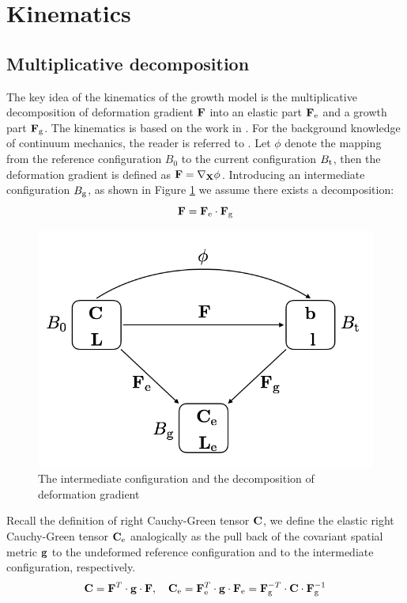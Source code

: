 \section{Kinematics} \label{Kinematics}
\subsection{Multiplicative decomposition}
The key idea of the kinematics of the growth model is the multiplicative decomposition of deformation gradient $\bold{F}$ into an elastic part $\bold{F}_{\mathrm{e}}$ and a growth part $\bold{F}_{\mathrm{g}}$. The kinematics is based on the work in \cite{Himpel, Goktepe2}. For the background knowledge of continuum mechanics, the reader is referred to \cite{Holzapfel}. Let $\phi$ denote the mapping from the reference configuration $B_0$ to the current configuration $B_{\mathrm{t}}$, then the deformation gradient is defined as $\bold{F} = \nabla_{\bold{X}} \phi$. Introducing an intermediate configuration $B_{\mathrm{g}}$, as shown in Figure \ref{fig:decomposition} we assume there exists a decomposition:
\begin{equation} \label{eq:decomposition}
\bold{F} = \bold{F}_{\mathrm{e}} \cdot \bold{F}_{\mathrm{g}}
\end{equation}

\begin{figure}[H]
   \centering
   \includegraphics[width=.5\textwidth]{./figures/decomposition.png} %
   \caption{The intermediate configuration and the decomposition of deformation gradient}
   \label{fig:decomposition}
\end{figure}

Recall the definition of right Cauchy-Green tensor $\bold{C}$, we define the elastic right Cauchy-Green tensor $\bold{C}_{\mathrm{e}}$ analogically as the pull back of the covariant spatial metric $\bold{g}$ to the undeformed reference configuration and to the intermediate configuration, respectively.
\begin{equation} \label{eq:defCe}
\bold{C} = \bold{F}^T \cdot \bold{g} \cdot \bold{F}, \quad \bold{C}_{\mathrm{e}} = \bold{F}_{\mathrm{e}}^T \cdot \bold{g} \cdot \bold{F}_{\mathrm{e}}
=  \bold{F}_{\mathrm{g}}^{-T} \cdot \bold{C} \cdot \bold{F}_{\mathrm{g}}^{-1}
\end{equation}

